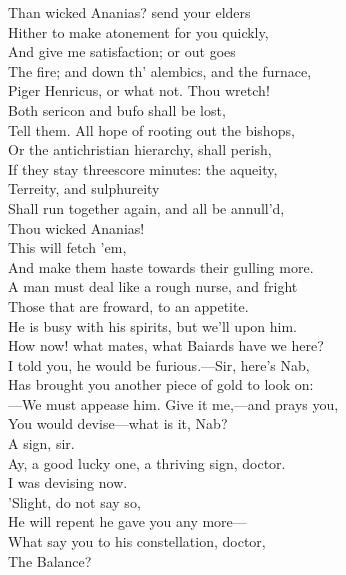 \documentclass[a4paper,oneside]{memoir}
\begin{document}
\begin{drama*}
Than wicked Ananias? send your elders\\
Hither to make atonement for you quickly,\\
And give me satisfaction; or out goes\\
The fire; and down th' alembics, and the furnace,\\
Piger Henricus, or what not. Thou wretch!\\
Both sericon and bufo shall be lost,\\
Tell them. All hope of rooting out the bishops,\\
Or the antichristian hierarchy, shall perish,\\
If they stay threescore minutes: the aqueity,\\
Terreity, and sulphureity\\
Shall run together again, and all be annull'd,\\
Thou wicked Ananias!\\
 This will fetch 'em,\\
And make them haste towards their gulling more.\\
A man must deal like a rough nurse, and fright\\
Those that are froward, to an appetite.\\
\facespeaks He is busy with his spirits, but we'll upon him.\\
\subtlespeaks How now! what mates, what Baiards have we here?\\
\facespeaks I told you, he would be furious.---Sir, here's Nab,\\
Has brought you another piece of gold to look on:\\
---We must appease him. Give it me,---and prays you,\\
You would devise---what is it, Nab?\\
\druggerspeaks {} A sign, sir.\\
\facespeaks Ay, a good lucky one, a thriving sign, doctor.\\
\subtlespeaks I was devising now.\\
\facespeaks {} 'Slight, do not say so,\\
He will repent he gave you any more---\\
What say you to his constellation, doctor,\\
The Balance?\\

\end{drama*}
\end{document}
